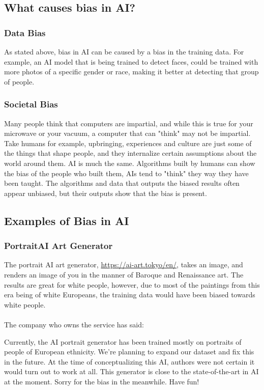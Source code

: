 \documentclass[titlepage]{article}
\begin{document}
\subsection{What causes bias in AI?}
\subsubsection{Data Bias}
As stated above, bias in AI can be caused by a bias in the training data. For example, an AI model that is being trained to detect faces, could be trained with more photos of a specific gender or race, making it better at detecting that group of people.

\subsubsection{Societal Bias}
Many people think that computers are impartial, and while this is true for your microwave or your vacuum, a computer that can "think" may not be impartial. Take humans for example, upbringing, experiences and culture are just some of the things that shape people, and they internalize certain assumptions about the world around them. AI is much the same. Algorithms built by humans can show the bias of the people who built them, AIs tend to "think" they way they have been taught. The algorithms and data that outputs the biased results often appear unbiased, but their outputs show that the bias is present. 

\subsection{Examples of Bias in AI}
\subsubsection{PortraitAI Art Generator}
The portrait AI art generator, \url{https://ai-art.tokyo/en/}, takes an image, and renders an image of you in the manner of Baroque and Renaissance art. The results are great for white people, however, due to most of the paintings from this era being of white Europeans, the training data would have been biased towards white people.
\\\\
The company who owns the service has said:
\begin{quoting}
    Currently, the AI portrait generator has been trained mostly on portraits of people of European ethnicity. We're planning to expand our dataset and fix this in the future. At the time of conceptualizing this AI, authors were not certain it would turn out to work at all. This generator is close to the state-of-the-art in AI at the moment. Sorry for the bias in the meanwhile. Have fun!
\end{quoting}
\end{document}
